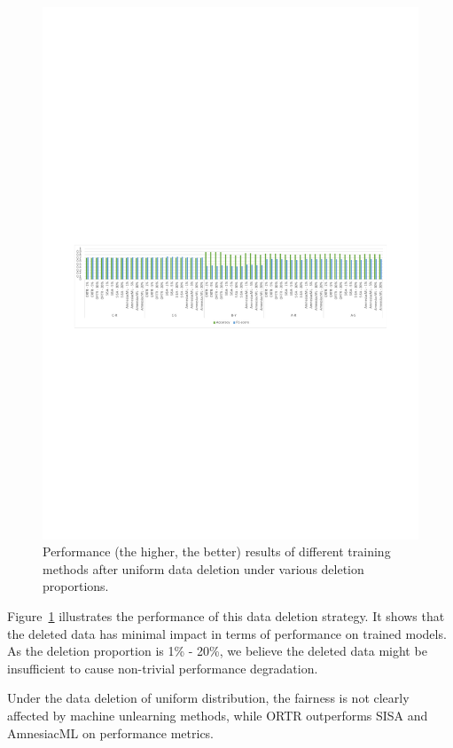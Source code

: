 \begin{figure}[htbp]
  \centering
  \includegraphics[width=1.0\textwidth]{assets/rq2-performance.pdf}
  \caption{Performance (the higher, the better) results of different training methods after uniform data deletion under various deletion proportions.}
  \label{fig:rq2-peformance}
 \vspace{-6pt}
\end{figure}

Figure~\ref{fig:rq2-peformance} illustrates the performance of this data deletion strategy. It shows that the deleted data has minimal impact in terms of performance on trained models. As the deletion proportion is 1\% - 20\%, we believe the deleted data might be insufficient to cause non-trivial performance degradation.

\begin{tcolorbox}
Under the data deletion of uniform distribution, the fairness is not clearly affected by machine unlearning methods, while ORTR outperforms SISA and AmnesiacML on performance metrics.
\end{tcolorbox}


